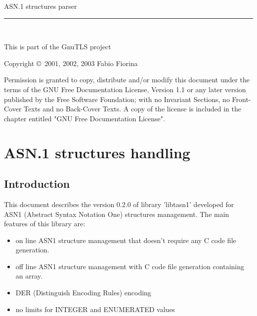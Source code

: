 \documentclass{book}
\newcommand{\HRule}{\rule{\linewidth}{0.4mm}}
\begin{document}
{\Large{ASN.1 structures parser}}
\vspace{-.3cm}
\\
\HRule
\vspace{-.6cm}
\\
\begin{flushright}
This is part of the GnuTLS project\\
\end{flushright}


\begin{center}
\par
Copyright \copyright\ 2001, 2002, 2003  Fabio Fiorina\\
\setlength{\parskip}{4mm}
\par
Permission is granted to copy, distribute and/or modify this
document under the terms of the GNU Free Documentation License,
Version 1.1 or any later version published by the Free Software
Foundation; with no Invariant Sections, no Front-Cover Texts and
no Back-Cover Texts.  A copy of the license is included in the
chapter entitled "GNU Free Documentation License".
\end{center}

\setlength{\parindent}{2mm}

\setlength{\parskip}{1mm}

\tableofcontents

\chapter{ASN.1 structures handling}

\section{Introduction}
 This document describes the version 0.2.0 of library 'libtasn1' developed
for ASN1 (Abstract Syntax Notation One) structures management.
The main features of this library are:
\begin{itemize}
\item on line ASN1 structure management that doesn't require any
C code file generation.
\item off line ASN1 structure management with C code file generation 
containing an array.
\item DER (Distinguish Encoding Rules) encoding
\item no limits for INTEGER and ENUMERATED values  
\end{itemize}
\end{document}
